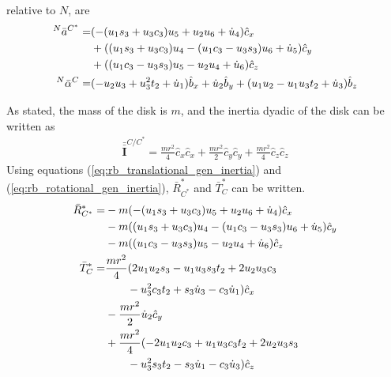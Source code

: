 \documentclass[smallcondensed,final]{svjour3}                     %
\begin{document}
relative to $N$, are
\begin{align}
    {^N}\bar{a}^{C^*} =& (-(u_1 s_3 + u_3 c_3) u_5 + u_2 u_6 +
                         \dot{u}_4) \hat{c}_x \notag \\
                      & + ((u_1 s_3 + u_3 c_3) u_4 - (u_1
                         c_3 - u_3 s_3) u_6 + \dot{u}_5) \hat{c}_y
                         \notag\\
                      & + ((u_1 c_3 - u_3 s_3) u_5 - u_2 u_4 +
                         \dot{u}_6) \hat{c}_z \\
    {^N}\bar{\alpha}^{C} =& (-u_2 u_3 + u_3^2 t_2 + \dot{u}_1) \hat{b}_x
                         + \dot{u}_2 \hat{b}_y + (u_1 u_2 - u_1 u_3 t_2 +
                         \dot{u}_3) \hat{b}_z
\end{align}

As stated, the mass of the disk is $m$, and the inertia dyadic of the disk can
be written as
\begin{align}
    \bar{\bar{\mathbf{I}}}^{C/C^*} = \frac{m r^2}{4} \hat{c}_x\hat{c}_x +
    \frac{m r^2}{2} \hat{c}_y\hat{c}_y + \frac{m r^2}{4} \hat{c}_z\hat{c}_z
\end{align}
Using equations (\ref{eq:rb_translational_gen_inertia}) and
(\ref{eq:rb_rotational_gen_inertia}), $\bar{R}^*_{C^*}$ and $\bar{T}^*_C$ can be
written.
\begin{align}
    \bar{R}^*_{C^*} =& - m (- (u_{1} s_3 + u_{3}
                       c_3) u_{5} + u_{2} u_{6} +
                       \dot{u}_{4}) \hat{c}_x \notag \\
                     & - m ((u_{1} s_3 + u_{3}
                       c_3) u_{4} - (u_{1}
                       c_3 - u_{3}
                       s_3) u_{6} + \dot{u}_{5})
                       \hat{c}_y \notag \\
                     & - m ((u_{1} c_3 - u_{3}
                       s_3) u_{5} - u_{2} u_{4} +
                   \dot{u}_{6}) \hat{c}_z \\
    \bar{T}^*_C =& \frac{m r^{2}}{4} (2 u_{1} u_{2} s_3
                   - u_{1} u_{3} s_3 t_2
                   + 2 u_{2} u_{3} c_3 \notag\\&\quad\quad- u_{3}^2
                   c_3 t_2 +
                   s_3 \dot{u}_{3} - c_3
                   \dot{u}_{1}) \hat{c}_x \notag \\
                 & - \frac{m r^{2}}{2} \dot{u}_{2} \hat{c}_y \notag \\
                 & + \frac{m r^{2}}{4} (- 2 u_{1} u_{2}
                   c_3 + u_{1} u_{3} c_3
                   t_2 + 2 u_{2} u_{3}
                   s_3 \notag\\&\quad\quad - u_{3}^2 s_3
                   t_2 - s_3 \dot{u}_{1}
                   - c_3 \dot{u}_{3}) \hat{c}_z
\end{align}
\end{document}
